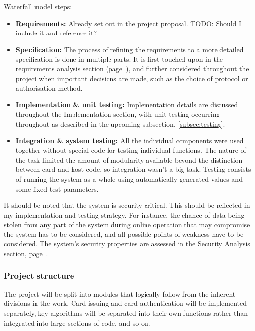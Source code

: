 \documentclass[12pt]{article}
\begin{document}
Waterfall model steps:
\begin{itemize}
	\item \textbf{Requirements:} Already set out in the project proposal. TODO: Should I include it and reference it?
	
	\item \textbf{Specification:} The process of refining the requirements to a more detailed specification is done in multiple parts. It is first touched upon in the requirements analysis section (page~\pageref{sec:requirements}), and further considered throughout the project when important decisions are made, such as the choice of protocol or authorisation method. %
	
	\item \textbf{Implementation \& unit testing:} Implementation details are discussed throughout the Implementation section, with unit testing occurring throughout as described in the upcoming subsection, \ref{subsec:testing}.
	
	\item \textbf{Integration \& system testing:} All the individual components were used together without special code for testing individual functions. The nature of the task limited the amount of modularity available beyond the distinction between card and host code, so integration wasn't a big task. Testing consists of running the system as a whole using automatically generated values and some fixed test parameters.
\end{itemize}

It should be noted that the system is security-critical. This should be reflected in my implementation and testing strategy. For instance, the chance of data being stolen from any part of the system during online operation that may compromise the system has to be considered, and all possible points of weakness have to be considered. The system's security properties are assessed in the Security Analysis section, page~\pageref{sec:security_analysis}.

\subsubsection{Project structure}
The project will be split into modules that logically follow from the inherent divisions in the work. Card issuing and card authentication will be implemented separately, key algorithms will be separated into their own functions rather than integrated into large sections of code, and so on. 
\end{document}
